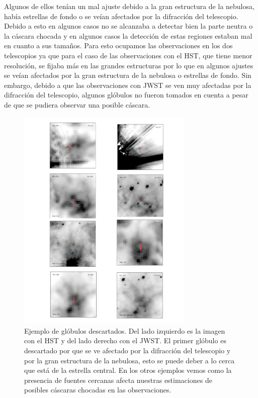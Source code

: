\documentclass{book}
\begin{document}
Algunos de ellos tenían un mal ajuste debido a la gran estructura de la nebulosa, había estrellas de fondo o se veían afectados por la difracción del telescopio.  Debido a esto en algunos casos no se alcanzaba a detectar bien la parte neutra o la cáscara chocada y en algunos casos la detección de estas regiones estaban mal en cuanto a sus tamaños.  Para esto ocupamos las observaciones en los dos telescopios ya que para el caso de las observaciones con el HST, que tiene menor resolución, se fijaba más en las grandes estructuras por lo que en algunos ajustes se veían afectados por la gran estructura de la nebulosa o estrellas de fondo. Sin embargo, debido a que las observaciones con JWST se ven muy afectadas por la difracción del telescopio, algunos glóbulos no fueron tomados en cuenta a pesar de que se pudiera observar una posible cáscara.

\begin{figure}[H]
    \centering
    \includegraphics[width=0.75\textwidth]{images Chapter 3/C3_badG.jpg}
    \caption{Ejemplo de glóbulos descartados. Del lado izquierdo es la imagen con el HST y del lado derecho con el JWST. El primer glóbulo es descartado por que se ve afectado por la difracción del telescopio y por la gran estructura de la nebulosa, esto se puede deber a lo cerca que está de la estrella central. En los otros ejemplos vemos como la presencia de fuentes cercanas afecta nuestras estimaciones de posibles cáscaras chocadas en las observaciones.}
    \label{Bad Globules}
\end{figure}
\end{document}

